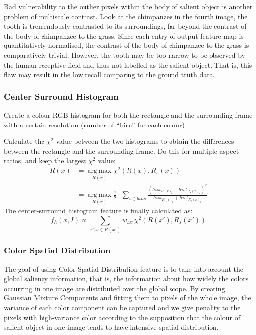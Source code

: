 \documentclass[10pt,twocolumn,letterpaper]{article}
\DeclareMathOperator*{\argmax}{arg\,max}
\newcommand{\SUM}{\sum\limits}
\begin{document}
Bad vulnerability to the outlier pixels within the body of salient object is another problem of multiscale contrast. 
Look at the chimpanzee in the fourth image, the tooth is tremendously contrasted to its surroundings,
far beyond the contrast of the body of chimpanzee to the grass. Since each entry of output feature map 
is quantitatively normalised, the contrast of the body of chimpanzee to the grass is comparatively trivial.
However, the tooth may be too narrow to be observed by the human receptive field and thus not 
labelled as the salient object. That is, this flaw may result in the low recall comparing to the ground truth data.%

\subsubsection{Center Surround Histogram}
Create a colour RGB histogram for both the rectangle and the surrounding frame with a certain resolution (number of ``bins'' for each colour)

    Calculate the $\chi^2$ value between the two histograms to obtain the differences between the rectangle and the surrounding frame.  Do this for multiple aspect ratios, and keep the largest $\chi^2$ value: %
    \begin{align*}
    R(x) &= \argmax\limits_{R(x)}\chi^2(R(x), R_s(x)) \\ &=\argmax\limits_{R(x)}\frac{1}{2}\cdot\SUM_{i\in bins}\frac{(hist_{R(x)_i}-hist_{R_s(x)_i})^2}{hist_{R(x)_i}+hist_{R_s(x)_i}}
    \end{align*}
    The center-surround histogram feature is finally calculated as:
    $$
    f_h(x,I)\propto\SUM_{x'|x\in R(x')}w_{xx'}\chi^2(R(x'),R_s(x'))
    $$

\subsubsection{Color Spatial Distribution}
    The goal of using Color Spatial Distribution feature is to take into account the global saliency information, 
    that is, the information about how widely the colors occurring in one image are distributed over the global scope.
    By creating Gaussian Mixture Components and fitting them to pixels of the whole image, the
    variance of each color component can be captured and we give penality to the pixels with high-variance 
    color according to the supposition that the colour of salient object in one image tends to have 
    intensive spatial distribution.
    
\end{document}
